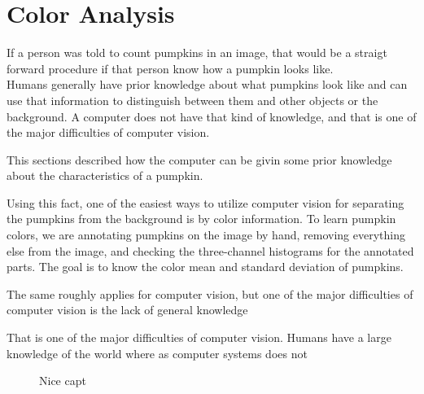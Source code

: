 \documentclass[../Head/Main.tex]{subfiles}
\begin{document}
\section{Color Analysis}\label{sec:colorAnalysis}

If a person was told to count pumpkins in an image, that would be a straigt forward procedure if that person know how a pumpkin looks like.\\
Humans generally have prior knowledge about what pumpkins look like and can use that information to distinguish between them and other objects or the background.
A computer does not have that kind of knowledge, and that is one of the major difficulties of computer vision.\par
This sections described how the computer can be givin some prior knowledge about the characteristics of a pumpkin. 

Using this fact, one of the easiest ways to utilize computer vision for separating the pumpkins from the background is by color information.
To learn pumpkin colors, we are annotating pumpkins on the image by hand, removing everything else from the image, and checking the three-channel histograms for the annotated parts.
The goal is to know the color mean and standard deviation of pumpkins.


The same roughly applies for computer vision, but one of the major difficulties of computer vision is the lack of general knowledge


That is one of the major difficulties of computer vision. Humans have a large knowledge of the world where as computer systems does not




\begin{figure}[H]
	\centering
	\scalebox{0.9}{
	}
	\caption{Nice capt}
	\label{fig:color_mean}
\end{figure}
\end{document}
